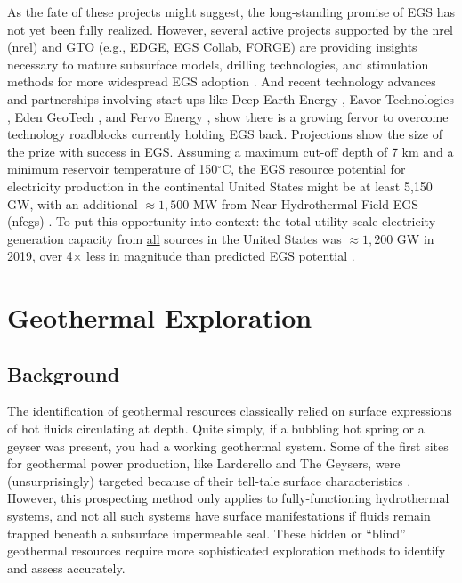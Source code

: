 As the fate of these projects might suggest, the long-standing promise of EGS has not yet been fully realized. However, several active projects supported by the \acrlong{nrel} (\acrshort{nrel}) and GTO (e.g., EDGE, EGS Collab, FORGE) are providing insights necessary to mature subsurface models, drilling technologies, and stimulation methods for more widespread EGS adoption \citep{hamm_geothermal_2021}. And recent technology advances and partnerships involving start-ups like Deep Earth Energy \citep{geoenergy_saskatchewan_2021}, Eavor Technologies \citep{ross_energy_2020}, Eden GeoTech \citep{daso_eden_2020}, and Fervo Energy \citep{moss_google_2021,shieber_geothermal_2021}, show there is a growing fervor to overcome technology roadblocks currently holding EGS back. Projections show the size of the prize with success in EGS. Assuming a maximum cut-off depth of 7 km and a minimum reservoir temperature of 150$^\circ$C, the EGS resource potential for electricity production in the continental United States might be at least 5,150 GW, with an additional $\approx1,500$ MW from Near Hydrothermal Field-EGS (\acrshort{nfegs}) \citep{augustine_geovision_2019}. To put this opportunity into context: the total utility-scale electricity generation capacity from \underline{all} sources in the United States was $\approx1,200$ GW in 2019, over 4$\times$ less in magnitude than predicted EGS potential \citep{eia_electric_2020}.
\vfill

\section{Geothermal Exploration}\label{ch2:geoexp}
\subsection{Background}\label{ch2:expl_background}
The identification of geothermal resources classically relied on surface expressions of hot fluids circulating at depth. Quite simply, if a bubbling hot spring or a geyser was present, you had a working geothermal system. Some of the first sites for geothermal power production, like Larderello and The Geysers, were (unsurprisingly) targeted because of their tell-tale surface characteristics \citep[p.\ 111]{glassley_geothermal_2015}. However, this prospecting method only applies to fully-functioning hydrothermal systems, and not all such systems have surface manifestations if fluids remain trapped beneath a subsurface impermeable seal. These hidden or “blind” geothermal resources require more sophisticated exploration methods to identify and assess accurately.

